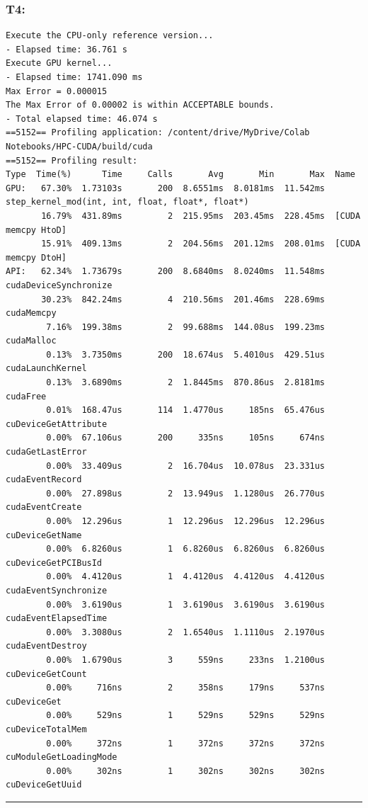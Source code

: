 \subsubsection*{T4:}
{\scriptsize
\begin{verbatim}
Execute the CPU-only reference version...
- Elapsed time: 36.761 s
Execute GPU kernel...
- Elapsed time: 1741.090 ms
Max Error = 0.000015
The Max Error of 0.00002 is within ACCEPTABLE bounds.
- Total elapsed time: 46.074 s
==5152== Profiling application: /content/drive/MyDrive/Colab Notebooks/HPC-CUDA/build/cuda
==5152== Profiling result:
Type  Time(%)      Time     Calls       Avg       Min       Max  Name
GPU:   67.30%  1.73103s       200  8.6551ms  8.0181ms  11.542ms  step_kernel_mod(int, int, float, float*, float*)
       16.79%  431.89ms         2  215.95ms  203.45ms  228.45ms  [CUDA memcpy HtoD]
       15.91%  409.13ms         2  204.56ms  201.12ms  208.01ms  [CUDA memcpy DtoH]
API:   62.34%  1.73679s       200  8.6840ms  8.0240ms  11.548ms  cudaDeviceSynchronize
       30.23%  842.24ms         4  210.56ms  201.46ms  228.69ms  cudaMemcpy
        7.16%  199.38ms         2  99.688ms  144.08us  199.23ms  cudaMalloc
        0.13%  3.7350ms       200  18.674us  5.4010us  429.51us  cudaLaunchKernel
        0.13%  3.6890ms         2  1.8445ms  870.86us  2.8181ms  cudaFree
        0.01%  168.47us       114  1.4770us     185ns  65.476us  cuDeviceGetAttribute
        0.00%  67.106us       200     335ns     105ns     674ns  cudaGetLastError
        0.00%  33.409us         2  16.704us  10.078us  23.331us  cudaEventRecord
        0.00%  27.898us         2  13.949us  1.1280us  26.770us  cudaEventCreate
        0.00%  12.296us         1  12.296us  12.296us  12.296us  cuDeviceGetName
        0.00%  6.8260us         1  6.8260us  6.8260us  6.8260us  cuDeviceGetPCIBusId
        0.00%  4.4120us         1  4.4120us  4.4120us  4.4120us  cudaEventSynchronize
        0.00%  3.6190us         1  3.6190us  3.6190us  3.6190us  cudaEventElapsedTime
        0.00%  3.3080us         2  1.6540us  1.1110us  2.1970us  cudaEventDestroy
        0.00%  1.6790us         3     559ns     233ns  1.2100us  cuDeviceGetCount
        0.00%     716ns         2     358ns     179ns     537ns  cuDeviceGet
        0.00%     529ns         1     529ns     529ns     529ns  cuDeviceTotalMem
        0.00%     372ns         1     372ns     372ns     372ns  cuModuleGetLoadingMode
        0.00%     302ns         1     302ns     302ns     302ns  cuDeviceGetUuid
\end{verbatim}
}

\hrule

